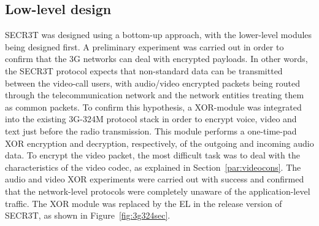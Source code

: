 \documentclass[10pt, conference, compsocconf]{IEEEtran}
\begin{document}



\subsection{Low-level design}
SECR3T was designed using a bottom-up approach, with the lower-level modules being designed first.
A preliminary experiment was carried out in order to confirm that the 3G networks can deal with encrypted payloads. In other words, the SECR3T protocol expects that non-standard data can be transmitted between the video-call users, with audio/video encrypted packets being routed through the telecommunication network and the network entities treating them as common packets. To confirm this hypothesis, a XOR-module was integrated into the existing 3G-324M protocol stack in order to encrypt voice, video and text just before the radio transmission. This module performs a one-time-pad XOR encryption and decryption, respectively, of the outgoing and incoming audio data. To encrypt the video packet, the most difficult task was to deal with the characteristics of the video codec, as explained in Section~\ref{par:videocons}.
The audio and video XOR experiments were carried out with success and confirmed that the network-level protocols were completely unaware of the application-level traffic. The XOR module was replaced by the EL in the release version of SECR3T, as shown in Figure~\ref{fig:3g324sec}.
\\
\end{document}

